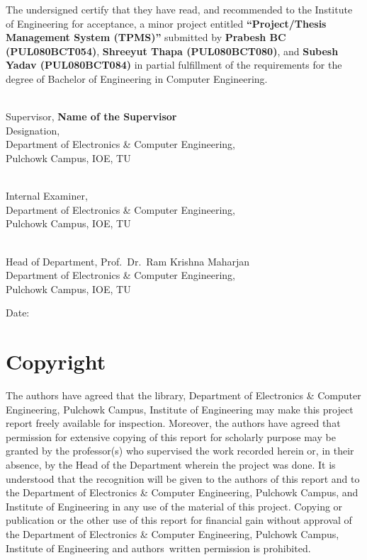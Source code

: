\documentclass[12pt,a4paper]{report}
\begin{document}
\vspace{0.4cm}
The undersigned certify that they have read, and recommended to the Institute of Engineering for acceptance, a minor project entitled \textbf{``Project/Thesis Management System (TPMS)''} submitted by \textbf{Prabesh BC (PUL080BCT054)}, \textbf{Shreeyut Thapa (PUL080BCT080)}, and \textbf{Subesh Yadav (PUL080BCT084)} in partial fulfillment of the requirements for the degree of Bachelor of Engineering in Computer Engineering.

\vspace{0.8cm}
\noindent\underline{\hspace{8.5cm}}\\
Supervisor, \textbf{Name of the Supervisor}\\
Designation,\\
Department of Electronics \& Computer Engineering,\\
Pulchowk Campus, IOE, TU

\vspace{0.7cm}
\noindent\underline{\hspace{8.5cm}}\\
Internal Examiner,\\
Department of Electronics \& Computer Engineering,\\
Pulchowk Campus, IOE, TU

\vspace{0.7cm}
\noindent\underline{\hspace{8.5cm}}\\
Head of Department, Prof.\ Dr.\ Ram Krishna Maharjan\\
Department of Electronics \& Computer Engineering,\\
Pulchowk Campus, IOE, TU

\vspace{0.7cm}
\noindent Date:\;\underline{\hspace{5cm}}

\chapter*{Copyright}

The authors have agreed that the library, Department of Electronics \& Computer Engineering, Pulchowk Campus, Institute of Engineering may make this project report freely available for inspection. Moreover, the authors have agreed that permission for extensive copying of this report for scholarly purpose may be granted by the professor(s) who supervised the work recorded herein or, in their absence, by the Head of the Department wherein the project was done. It is understood that the recognition will be given to the authors of this report and to the Department of Electronics \& Computer Engineering, Pulchowk Campus, and Institute of Engineering in any use of the material of this project. Copying or publication or the other use of this report for financial gain without approval of the Department of Electronics \& Computer Engineering, Pulchowk Campus, Institute of Engineering and authors\textquotesingle\ written permission is prohibited.
\end{document}
